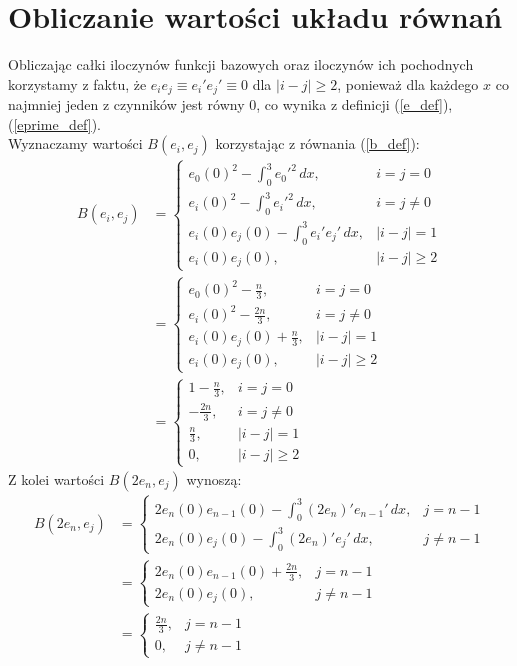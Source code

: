 \documentclass[a4paper,12pt]{article}
\begin{document}
    \section{Obliczanie wartości układu równań}
    Obliczając całki iloczynów funkcji bazowych oraz iloczynów ich pochodnych korzystamy z faktu, że \(e_i e_j \equiv e_i' e_j' \equiv 0\) dla \(|i-j| \geq 2\), ponieważ dla każdego \(x\) co najmniej jeden z czynników jest równy 0, co wynika z definicji (\ref{e_def}), (\ref{eprime_def}).\\
    Wyznaczamy wartości \(B(e_i, e_j)\) korzystając z równania (\ref{b_def}):
    \begin{align}
        B(e_i, e_j) &=
        \begin{cases}
            e_0(0)^2 - \int_{0}^{3} e_0'^2\,dx,& i = j = 0 \\
            e_i(0)^2 - \int_{0}^{3} e_i'^2\,dx,& i = j \neq 0 \\
            e_i(0)e_j(0) - \int_{0}^{3} e_i' e_j'\,dx,& |i-j| = 1 \\
            e_i(0)e_j(0),& |i-j| \geq 2
        \end{cases} \nonumber \\
        &=
        \begin{cases}
            e_0(0)^2 - \frac{n}{3},& i = j = 0 \\
            e_i(0)^2 - \frac{2n}{3},& i = j \neq 0 \\
            e_i(0)e_j(0) + \frac{n}{3},& |i-j| = 1 \\
            e_i(0)e_j(0),& |i-j| \geq 2
        \end{cases} \nonumber \\
        &=
        \begin{cases}
            1-\frac{n}{3},& i = j = 0 \\
            -\frac{2n}{3},& i = j \neq 0 \\
            \frac{n}{3},& |i-j| = 1 \\
            0,& |i-j| \geq 2
        \end{cases} \label{bij_val}
    \end{align}
    Z kolei wartości \(B(2e_n, e_j)\) wynoszą:
    \begin{align}
        B(2e_n, e_j) &=
        \begin{cases}
            2e_n(0)e_{n-1}(0) - \int_{0}^{3} (2e_n)' e_{n-1}'\,dx,& j = n-1 \\
            2e_n(0)e_j(0) - \int_{0}^{3} (2e_n)' e_j'\,dx,& j \neq n-1
        \end{cases} \nonumber \\
        &=
        \begin{cases}
            2e_n(0)e_{n-1}(0) + \frac{2n}{3},& j = n-1 \\
            2e_n(0)e_j(0),& j \neq n-1
        \end{cases} \nonumber \\
        &=
        \begin{cases}
            \frac{2n}{3},& j = n-1 \\
            0,& j \neq n-1
        \end{cases} \label{bnj_val}
    \end{align}
\end{document}
